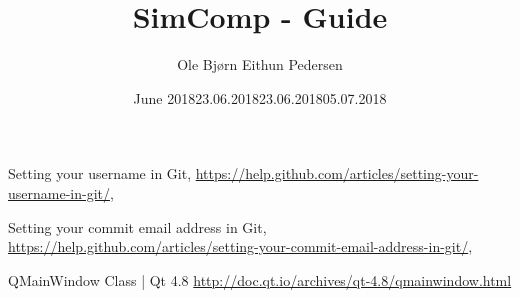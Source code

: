 \documentclass{article}
\title{SimComp - Guide}
\author{Ole Bjørn Eithun Pedersen}
\date{June 2018}
\begin{document}
\maketitle
\tableofcontents
\newpage



\newpage





\begin{thebibliography}{9}
\label{username}
  Setting your username in Git, \url{https://help.github.com/articles/setting-your-username-in-git/}, \date{23.06.2018}
\label{email}
    Setting your commit email address in Git, \url{https://help.github.com/articles/setting-your-commit-email-address-in-git/}, \date{23.06.2018}
\label{qmainwindow}
    QMainWindow Class | Qt 4.8
    \url{http://doc.qt.io/archives/qt-4.8/qmainwindow.html}
    \date{05.07.2018}
\end{thebibliography}
\end{document}
